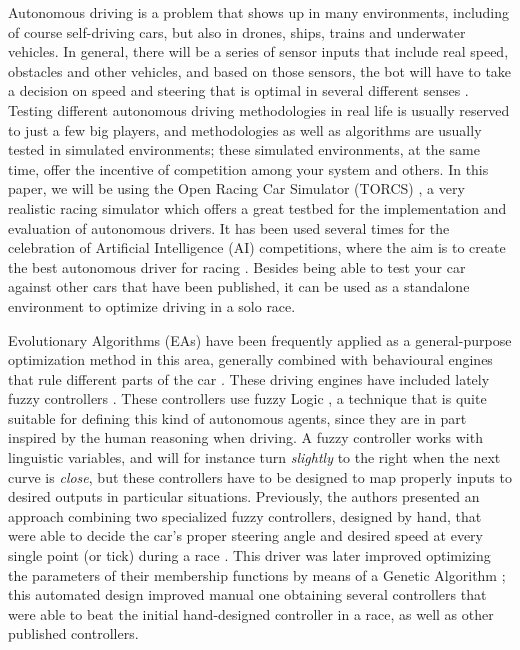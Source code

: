 \documentclass[conference]{IEEEtran}
\begin{document}
Autonomous driving is a problem that shows up in many environments,
including of course self-driving cars, but also in drones, ships,
trains and underwater vehicles. In general, there will be a series of
sensor inputs that include real speed, obstacles and other vehicles,
and based on those sensors, the bot will have to take a decision on
speed and steering that is optimal in several different
senses \cite{Autodriv2006}. Testing different autonomous driving methodologies in real life is usually reserved to just a few big players, and methodologies
as well as algorithms are usually tested in simulated environments;
these simulated environments, at the same time, offer the incentive of
competition among your system and others. In this paper, we will be
using the Open Racing Car Simulator (TORCS) \cite{torcs4}, a very
realistic racing simulator which offers a great testbed for the
implementation and evaluation of autonomous drivers.  
It has been used several times for the celebration of Artificial
Intelligence (AI) competitions, where the aim is to create the best
autonomous driver for racing
\cite{SimulatedCarRacing-2008,oponnents2010,Torcs3,manualTORCS}. Besides being
able to test your car against other cars that have been published, it
can be used as a standalone environment to optimize driving in a
solo race. 

Evolutionary Algorithms (EAs) \cite{EAs_Back96} have been frequently
applied as a general-purpose optimization method in this area,
generally combined with behavioural engines that rule different parts
of the car
\cite{Floreano2004,CarRacing_Pelta09,SAES2012,torcs2012}. These
driving engines have included lately fuzzy controllers
\cite{Guadarrama2008, LFAG, PerezEvolvingFuzzy09}. These controllers
use fuzzy Logic \cite{Fuzzy2011}, a  technique that is quite suitable
for defining this kind of autonomous agents, since they are in part
inspired by the human reasoning when driving. A fuzzy controller works
with linguistic variables, and will for instance turn {\em slightly}
to the right when the next curve is {\em close}, but these controllers
have to be designed to map properly inputs to desired outputs in
particular situations. Previously, the authors presented an approach
combining two specialized fuzzy controllers, designed by hand, that
were able to decide the car's proper steering angle and desired speed
at every single point (or tick) during a race \cite{evo17}. This
driver was later improved \cite{evo18} optimizing the parameters of
their membership functions by means of a Genetic Algorithm
\cite{GAs_Goldberg89}; this automated design improved manual one
obtaining several controllers that were able to beat the initial
hand-designed controller in a race, as well as other published
controllers. 
\end{document}
